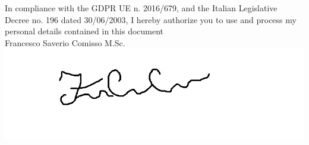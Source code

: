 \documentclass[10pt,a4paper,ragged2e,withhyper]{altacv}
\begin{document}
\begin{paracol}{2}

\divider

\divider


\medskip









{}


\switchcolumn
\newpage


In compliance with the GDPR UE n. 2016/679, 
and the Italian Legislative Decree no. 196 dated 30/06/2003, 
I hereby authorize you to use and process my personal details contained in this document
\\

Francesco Saverio Comisso M.Sc.
\includegraphics[height=4\baselineskip]{Firma.jpg}






\end{paracol}
\end{document}
